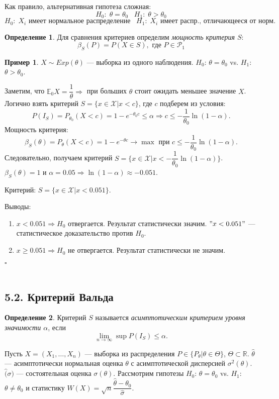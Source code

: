 \documentclass[12pt]{report}
\newenvironment{solution}{{\bfseries Решение:}}{$\square$\\\\}
\theoremstyle{definition}
\newtheorem{definition}{Определение}
\newtheorem{example}{Пример}
\begin{document}
Как правило, альтернативная гипотеза сложная:
$$H_0: \; \theta = \theta_0 \;\;\; H_1: \; \theta > \theta_0$$
$$H_0: \; X_i \text{ имеет нормальное распределение} \;\;\; H_1: \; X_i \text{ имеет распр., отличающееся от норм.}$$
\begin{definition}
	Для сравнения критериев определим \emph{мощность критерия $S$}:
	$$\beta_S(P) = P(X \in S), \text{ где } P \in \mathscr{P}_1$$
\end{definition}
\begin{example}
	$X \sim Exp(\theta)$ — выборка из одного наблюдения. $H_0$: $\theta = \theta_0$ vs. $H_1$: $\theta > \theta_0$.
\end{example}
\begin{solution}
	Заметим, что $\mathbb{E}_0 X = \dfrac{1}{\theta} \Rightarrow$ при больших $\theta$ стоит ожидать меньшее значение $X$. Логично взять критерий $S = \{x \in \mathscr{X} | x < c\}$, где $c$ подберем из условия: $$P(I_S) = P_{\theta_0}(X < c) = 1 - e^{-\theta_0 c} \leqslant \alpha \Rightarrow c \leqslant -\dfrac{1}{\theta_0}\ln (1-\alpha).$$
	Мощность критерия:
	$$\beta_S(\theta) = P_\theta(X < c) = 1 - e^{-\theta c} \rightarrow \max \text{ при } c \leqslant -\dfrac{1}{\theta_0}\ln (1-\alpha).$$
	Следовательно, получаем критерий $S = \{x \in \mathscr{X} | x < -\dfrac{1}{\theta_0} \ln(1-\alpha)\}$. $\beta_S(\theta) = 1$ и $\alpha = 0.05 \Rightarrow \ln(1 - \alpha) \approx -0.051$. 
	
	Критерий: $S = \{x \in \mathscr{X} | x < 0.051\}$.

	Выводы:
	\begin{enumerate}
		\item $x < 0.051 \Rightarrow H_0$ отвергается. Результат статистически значим. $"x < 0.051"$ — статистическое доказательство против $H_0$.
		\item $x \geqslant 0.051 \Rightarrow H_0$ не отвергается. Результат статистически не значим.
	\end{enumerate}
\end{solution}

\subsection{5.2. Критерий Вальда}
\begin{definition}
	Критерий $S$ называется \emph{асимптотическим критерием уровня значимости $\alpha$}, если
	$$\displaystyle{\lim_{n\to \infty}} \sup P(I_S) \leqslant \alpha.$$
\end{definition}
Пусть $X = (X_1, \ldots, X_n)$ — выборка из распределения $P \in \{P_\theta | \theta \in \Theta\}$, $\Theta \subset \mathbb{R}$. $\hat{\theta}$ — асимптотически нормальная оценка $\theta$ с асимптотической дисперсией $\sigma^2(\theta)$. $\hat(\sigma)$ — состоятельная оценка $\sigma(\theta)$.
Рассмотрим гипотезы $H_0$: $\theta = \theta_0$ vs. $H_1$: $\theta \neq \theta_0$ и статистику $W(X) = \sqrt{n}\dfrac{\hat{\theta} - \theta_0}{\hat{\sigma}}$.
\end{document}
